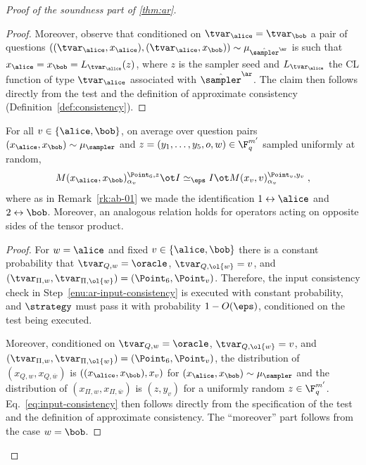 \begin{proof}[Proof of the soundness part of \cref{thm:ar}]
\begin{proof}
    Moreover, observe that conditioned on $\tvar_\alice = \tvar_\bob$ a pair of
    questions $((\tvar_\alice,x_\alice),(\tvar_\alice,x_\bob))\sim
    \mu_{\tsans}$ is such that $x_\alice = x_\bob = L_{\tvar_\alice}(z)$,
    where $z$ is the sampler seed and $L_{\tvar_\alice}$ the CL function of type
    $\tvar_\alice$ associated with $\tsans$.
    The claim then follows directly from the test and the definition of
    approximate consistency (Definition~\ref{def:consistency}).
  \end{proof}

  \begin{claim}
    \label{claim:ar-2}
    For all $v \in \{\alice,\bob\}$, on average over question pairs
    $({x}_\alice, {x}_\bob) \sim \mu_{\sampler}$ and $z=(y_1,\ldots,y_5,o,w)\in
    \F_q^{m'}$ sampled uniformly at random,
    \begin{equation}
      M({x}_\alice, {x}_\bob)^{\Point_6, z}_{\alpha_v} \ot I \simeq_{\eps} I \ot
      M(x_v,v)^{ \Point_v, y_v}_{\alpha_v}\;, \label{eq:input-consistency}
    \end{equation}
    where as in Remark~\ref{rk:ab-01} we made the identification
    $1\leftrightarrow \alice$ and $2\leftrightarrow \bob$.
    Moreover, an analogous relation holds for operators acting on opposite sides
    of the tensor product.
  \end{claim}

	\begin{proof}
    For $w=\alice$ and fixed $v\in\{\alice,\bob\}$ there is a constant
    probability that $\tvar_{Q,w} = \oracle$, $\tvar_{Q,\ol{w}}=v$, and
    $(\tvar_{\Pi,w},\tvar_{\Pi, \ol{w}}) = (\Point_6, \Point_{v})$.
    Therefore, the input consistency check in Step~\ref{enu:ar-input-consistency} is
    executed with constant probability, and $\strategy$ must pass it with
    probability $1-O(\eps)$, conditioned on the test being executed.

    Moreover, conditioned on $\tvar_{Q,w} = \oracle$, $\tvar_{Q,\ol{w}}=v$, and
    $(\tvar_{\Pi,w},\tvar_{\Pi, \ol{w}}) = (\Point_6, \Point_{v})$, the
    distribution of $(x_{Q,w},x_{Q,\overline{w}})$ is $((x_\alice,x_\bob),x_v)$
    for $(x_\alice,x_\bob)\sim \mu_\sampler$ and the distribution of
    $(x_{\Pi,w},x_{\Pi,\overline{w}})$ is $(z,y_v)$ for a uniformly random $z
    \in \F_q^{m'}$.
    Eq.~\eqref{eq:input-consistency} then follows directly from the
    specification of the test and the definition of approximate consistency.
    The ``moreover'' part follows from the case $w=\bob$.
  \end{proof}
	

\end{proof}

